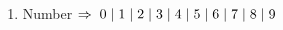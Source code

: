 \begin{enumerate}
\item Number $\Rightarrow \hspace{1 mm} 0 \hspace{1 mm} \vert \hspace{1 mm} 1 \hspace{1 mm} \vert \hspace{1 mm} 2 \hspace{1 mm} \vert \hspace{1 mm} 3 \hspace{1 mm} \vert \hspace{1 mm} 4 \hspace{1 mm} \vert \hspace{1 mm} 5 \hspace{1 mm} \vert \hspace{1 mm} 6 \hspace{1 mm} \vert \hspace{1 mm} 7 \hspace{1 mm} \vert \hspace{1 mm} 8 \hspace{1 mm} \vert \hspace{1 mm} 9$
\end{enumerate}


